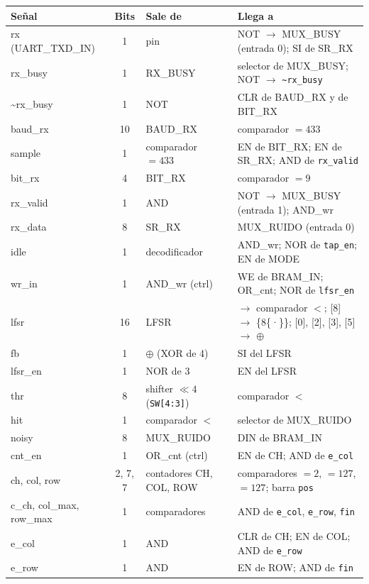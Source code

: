 \documentclass[11pt,a4paper]{article}
\begin{document}
{\small
\begin{longtable}{>{\ttfamily}l c >{\raggedright\arraybackslash}p{3.6cm} >{\raggedright\arraybackslash}p{6.45cm}}
\toprule
\normalfont\textbf{Señal} & \textbf{Bits} & \textbf{Sale de} & \textbf{Llega a} \\
\midrule
\endhead
rx (UART\_TXD\_IN) & 1 & pin & NOT $\to$ MUX\_BUSY (entrada 0); SI de SR\_RX \\
rx\_busy & 1 & RX\_BUSY & selector de MUX\_BUSY; NOT $\to$ \texttt{\textasciitilde rx\_busy} \\
\textasciitilde rx\_busy & 1 & NOT & CLR de BAUD\_RX y de BIT\_RX \\
baud\_rx & 10 & BAUD\_RX & comparador $= 433$ \\
sample & 1 & comparador $= 433$ & EN de BIT\_RX; EN de SR\_RX; AND de \texttt{rx\_valid} \\
bit\_rx & 4 & BIT\_RX & comparador $= 9$ \\
rx\_valid & 1 & AND & NOT $\to$ MUX\_BUSY (entrada 1); AND\_wr \\
rx\_data & 8 & SR\_RX & MUX\_RUIDO (entrada 0) \\
idle & 1 & decodificador & AND\_wr; NOR de \texttt{tap\_en}; EN de MODE \\
wr\_in & 1 & AND\_wr (ctrl) & WE de BRAM\_IN; OR\_cnt; NOR de \texttt{lfsr\_en} \\
lfsr & 16 & LFSR & [7:0] $\to$ comparador $<$; [8] $\to$ \{8\{·\}\}; [0], [2], [3], [5] $\to$ $\oplus$ \\
fb & 1 & $\oplus$ (XOR de 4) & SI del LFSR \\
lfsr\_en & 1 & NOR de 3 & EN del LFSR \\
thr & 8 & shifter $\ll4$ (\texttt{SW[4:3]}) & comparador $<$ \\
hit & 1 & comparador $<$ & selector de MUX\_RUIDO \\
noisy & 8 & MUX\_RUIDO & DIN de BRAM\_IN \\
cnt\_en & 1 & OR\_cnt (ctrl) & EN de CH; AND de \texttt{e\_col} \\
ch, col, row & 2, 7, 7 & contadores CH, COL, ROW & comparadores $= 2$, $= 127$, $= 127$; barra \texttt{pos} \\
c\_ch, col\_max, row\_max & 1 & comparadores & AND de \texttt{e\_col}, \texttt{e\_row}, \texttt{fin} \\
e\_col & 1 & AND & CLR de CH; EN de COL; AND de \texttt{e\_row} \\
e\_row & 1 & AND & EN de ROW; AND de \texttt{fin} \\

\end{longtable}}
\end{document}
